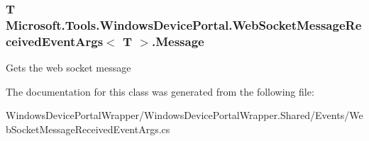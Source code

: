 \subsubsection[{\texorpdfstring{Message}{Message}}]{\setlength{\rightskip}{0pt plus 5cm}T {\bf Microsoft.\+Tools.\+Windows\+Device\+Portal.\+Web\+Socket\+Message\+Received\+Event\+Args}$<$ T $>$.Message\hspace{0.3cm}{\ttfamily [get]}}\hypertarget{class_microsoft_1_1_tools_1_1_windows_device_portal_1_1_web_socket_message_received_event_args_a6121cde3bf372903643917305072893b}{}\label{class_microsoft_1_1_tools_1_1_windows_device_portal_1_1_web_socket_message_received_event_args_a6121cde3bf372903643917305072893b}


Gets the web socket message 



The documentation for this class was generated from the following file\+:\begin{DoxyCompactItemize}
\item 
Windows\+Device\+Portal\+Wrapper/\+Windows\+Device\+Portal\+Wrapper.\+Shared/\+Events/Web\+Socket\+Message\+Received\+Event\+Args.\+cs\end{DoxyCompactItemize}
